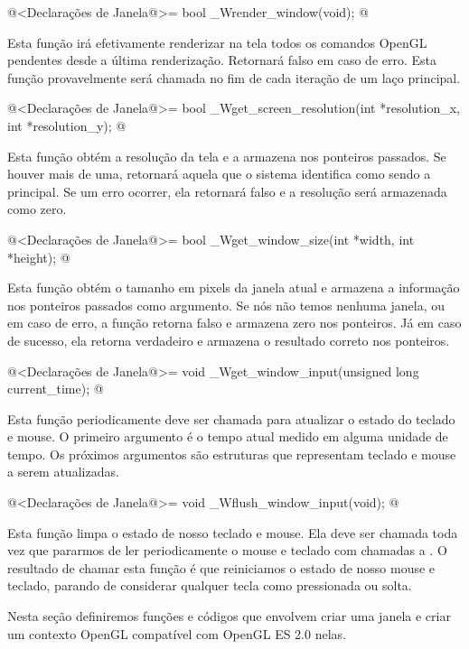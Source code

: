 \iniciocodigo
@<Declarações de Janela@>=
bool _Wrender_window(void);
@
\fimcodigo

Esta função irá efetivamente renderizar na tela todos os comandos
OpenGL pendentes desde a última renderização. Retornará falso em caso
de erro. Esta função provavelmente será chamada no fim de cada
iteração de um laço principal.

\iniciocodigo
@<Declarações de Janela@>=
bool _Wget_screen_resolution(int *resolution_x, int *resolution_y);
@
\fimcodigo

Esta função obtém a resolução da tela e a armazena nos ponteiros
passados. Se houver mais de uma, retornará aquela que o sistema
identifica como sendo a principal. Se um erro ocorrer, ela retornará
falso e a resolução será armazenada como zero.

\iniciocodigo
@<Declarações de Janela@>=
bool _Wget_window_size(int *width, int *height);
@
\fimcodigo

Esta função obtém o tamanho em pixels da janela atual e armazena a
informação nos ponteiros passados como argumento. Se nós não temos
nenhuma janela, ou em caso de erro, a função retorna falso e armazena
zero nos ponteiros. Já em caso de sucesso, ela retorna verdadeiro e
armazena o resultado correto nos ponteiros.

\iniciocodigo
@<Declarações de Janela@>=
void _Wget_window_input(unsigned long current_time);
@
\fimcodigo

Esta função periodicamente deve ser chamada para atualizar o estado do
teclado e mouse. O primeiro argumento é o tempo atual medido em alguma
unidade de tempo. Os próximos argumentos são estruturas que
representam teclado e mouse a serem atualizadas.

\iniciocodigo
@<Declarações de Janela@>=
void _Wflush_window_input(void);
@
\fimcodigo

Esta função limpa o estado de nosso teclado e mouse. Ela deve ser
chamada toda vez que pararmos de ler periodicamente o mouse e teclado
com chamadas a . O resultado de
chamar esta função é que reiniciamos o estado de nosso mouse e
teclado, parando de considerar qualquer tecla como pressionada ou
solta.


Nesta seção definiremos funções e códigos que envolvem criar uma
janela e criar um contexto OpenGL compatível com OpenGL ES 2.0 nelas.


